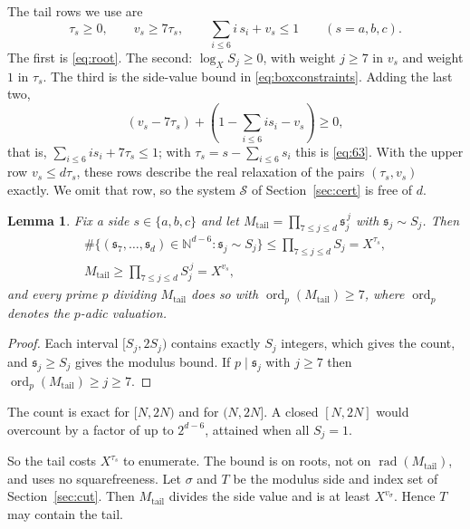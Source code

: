 \documentclass{amsart}
\newtheorem{lemma}{Lemma}[section]
\theoremstyle{definition}
\theoremstyle{plain}
\numberwithin{equation}{section}
\numberwithin{table}{section}
\newcommand{\rad}{\operatorname{rad}}
\newcommand{\N}{\mathbb{N}}
\begin{document}
The tail rows we use are
\begin{equation}\label{eq:tailrows}
 \tau_s\ge0,\qquad v_s\ge7\tau_s,\qquad \sum_{i\le6}i\,s_i+v_s\le1
 \qquad(s=a,b,c).
\end{equation}
The first is \eqref{eq:root}. The second: $\log_XS_j\ge0$, with weight
$j\ge7$ in $v_s$ and weight $1$ in $\tau_s$. The third is the side-value
bound in \eqref{eq:boxconstraints}. Adding the last two,
\[
 (v_s-7\tau_s)+(1-\sum_{i\le6}i s_i-v_s)\ge0,
\]
that is, $\sum_{i\le6}i s_i+7\tau_s\le1$; with $\tau_s=s-\sum_{i\le6}s_i$
this is \eqref{eq:63}. With the
upper row $v_s\le d\tau_s$, these rows describe the real relaxation of the
pairs $(\tau_s,v_s)$ exactly. We omit that row, so the system $\mathcal S$ of
Section~\ref{sec:cert} is free of $d$.

\begin{lemma}\label{lem:tail}
Fix a side $s\in\{a,b,c\}$ and let
$M_{\mathrm{tail}}=\prod_{7\le j\le d}\mathfrak s_j^{\,j}$ with
$\mathfrak s_j\sim S_j$. Then
\begin{equation}\label{eq:tailcount}
 \begin{gathered}
  \#\{(\mathfrak s_7,\dots,\mathfrak s_d)\in\N^{d-6}:\mathfrak s_j\sim S_j\}\le\prod_{7\le j\le d}S_j=X^{\tau_s},\\
  M_{\mathrm{tail}}\ge\prod_{7\le j\le d}S_j^{\,j}=X^{v_s},
 \end{gathered}
\end{equation}
and every prime $p$ dividing $M_{\mathrm{tail}}$ does so with
$\operatorname{ord}_p(M_{\mathrm{tail}})\ge7$, where $\operatorname{ord}_p$
denotes the $p$-adic valuation.
\end{lemma}

\begin{proof}
Each interval $[S_j,2S_j)$ contains exactly $S_j$ integers, which gives the
count, and $\mathfrak s_j\ge S_j$ gives the modulus bound. If $p\mid\mathfrak s_j$
with $j\ge7$ then $\operatorname{ord}_p(M_{\mathrm{tail}})\ge j\ge7$.
\end{proof}

The count is exact for $[N,2N)$ and for $(N,2N]$. A closed $[N,2N]$ would
overcount by a factor of up to $2^{d-6}$, attained when all $S_j=1$.

So the tail costs $X^{\tau_s}$ to enumerate. The bound is on roots, not on
$\rad(M_{\mathrm{tail}})$, and uses no squarefreeness. Let $\sigma$ and $T$ be the modulus side and
index set of Section~\ref{sec:cut}. Then $M_{\mathrm{tail}}$ divides the side
value and is at least $X^{v_\sigma}$.
Hence $T$ may contain the tail.
\end{document}
